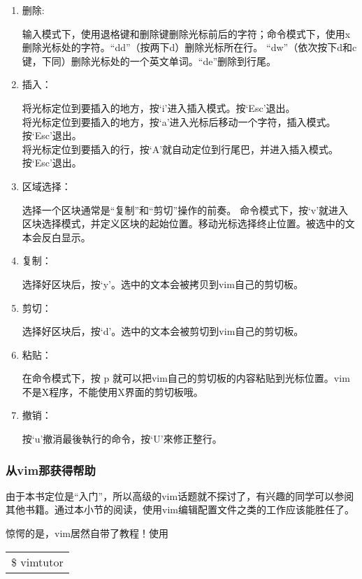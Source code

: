 \documentclass[amstex,twoside]{ctexbook}
\newenvironment{code}{\small\tt\begin{longtable}{p{0.8\textwidth}}}{\end{longtable}}
\begin{document}
\begin{enumerate}
\item 删除:

	输入模式下，使用退格键和删除键删除光标前后的字符；命令模式下，使用x删除光标处的字符。“dd”（按两下d）删除光标所在行。
	“dw”（依次按下d和c键，下同）删除光标处的一个英文单词。“de”删除到行尾。

\item 插入：

	将光标定位到要插入的地方，按‘i’进入插入模式。按‘Esc’退出。\\
	将光标定位到要插入的地方，按‘a’进入光标后移动一个字符，插入模式。按‘Esc’退出。\\
	将光标定位到要插入的行，按‘A’就自动定位到行尾巴，并进入插入模式。按‘Esc’退出。

\item 区域选择：

	选择一个区块通常是“复制”和“剪切”操作的前奏。
	命令模式下，按‘v’就进入区块选择模式，并定义区块的起始位置。移动光标选择终止位置。被选中的文本会反白显示。

\item 复制：

	选择好区块后，按‘y’。选中的文本会被拷贝到vim自己的剪切板。

\item 剪切：

	选择好区块后，按‘d’。选中的文本会被剪切到vim自己的剪切板。
	
\item 粘贴：

	在命令模式下，按 p 就可以把vim自己的剪切板的内容粘贴到光标位置。vim不是X程序，不能使用X界面的剪切板哦。

\item 撤销：

	按‘u’撤消最後執行的命令，按‘U’來修正整行。

\end{enumerate}


\subsubsection{从vim那获得帮助}

由于本书定位是“入门”，所以高级的vim话题就不探讨了，有兴趣的同学可以参阅其他书籍。通过本小节的阅读，使用vim编辑配置文件之类的工作应该能胜任了。

惊愕的是，vim居然自带了教程！使用



\begin{code}
\$ vimtutor
\end{code}
\end{document}
